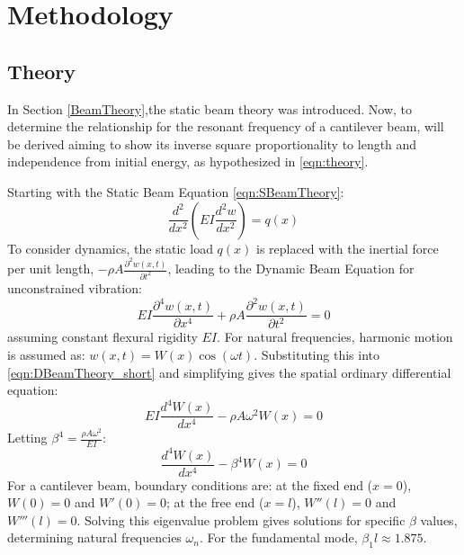 \documentclass[a4paper,12pt]{article}
\begin{document}
\section{Methodology} \label{Methodology}%

    \subsection{Theory}\label{Theory}%

    In Section \ref{BeamTheory},the static beam theory was introduced. Now, to determine the relationship for the resonant frequency of a cantilever beam, will be derived aiming to show its inverse square proportionality to length and independence from initial energy, as hypothesized in \eqref{eqn:theory}.

    Starting with the Static Beam Equation \eqref{eqn:SBeamTheory}:
    \begin{equation}\label{eqn:SBeamTheory}
    \frac{d^{2}}{dx^{2}}(EI\frac{d^{2}w}{dx^{2}})=q(x)
    \end{equation}
    To consider dynamics, the static load $q(x)$ is replaced with the inertial force per unit length, $-\rho A \frac{\partial^2 w(x,t)}{\partial t^2}$, leading to the Dynamic Beam Equation for unconstrained vibration:
    \begin{equation}\label{eqn:DBeamTheory_short}
    EI\frac{\partial^{4}w(x,t)}{\partial x^{4}} + \rho A \frac{\partial^2 w(x,t)}{\partial t^2} = 0
    \end{equation}
    assuming constant flexural rigidity $EI$.  For natural frequencies, harmonic motion is assumed as: $w(x,t) = W(x) \cos(\omega t)$. Substituting this into \eqref{eqn:DBeamTheory_short} and simplifying gives the spatial ordinary differential equation:
    \begin{equation}\label{eqn:SpatialODE_short}
    EI\frac{d^{4}W(x)}{d x^{4}} - \rho A \omega^2 W(x) = 0
    \end{equation}
    Letting $\beta^4 = \frac{\rho A \omega^2}{EI}$:
    \begin{equation}\label{eqn:SpatialODE_simple_short}
    \frac{d^{4}W(x)}{d x^{4}} - \beta^4 W(x) = 0
    \end{equation}
    For a cantilever beam, boundary conditions are: at the fixed end ($x=0$), $W(0) = 0$ and $W'(0) = 0$; at the free end ($x=l$), $W''(l) = 0$ and $W'''(l) = 0$. Solving this eigenvalue problem gives solutions for specific $\beta$ values, determining natural frequencies $\omega_n$.  For the fundamental mode, $\beta_1 l \approx 1.875$.
\end{document}
